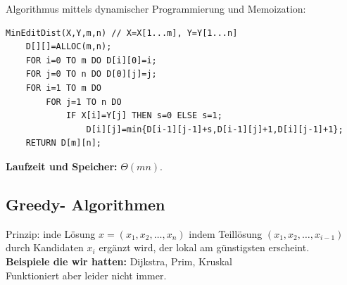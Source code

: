 \documentclass{article}
\begin{document}
                \newpage
                Algorithmus mittels dynamischer Programmierung und Memoization:
                \begin{lstlisting}[style=pseudocode]
MinEditDist(X,Y,m,n) // X=X[1...m], Y=Y[1...n]
    D[][]=ALLOC(m,n);
    FOR i=0 TO m DO D[i][0]=i;
    FOR j=0 TO n DO D[0][j]=j;
    FOR i=1 TO m DO
        FOR j=1 TO n DO
            IF X[i]=Y[j] THEN s=0 ELSE s=1;
                D[i][j]=min{D[i-1][j-1]+s,D[i-1][j]+1,D[i][j-1]+1};
    RETURN D[m][n];
                \end{lstlisting}
                \textbf{Laufzeit und Speicher:} $\Theta (mn)$.
        \subsection{Greedy- Algorithmen}
            Prinzip: inde Lösung $x=(x_1,x_2,\dots ,x_n)$ indem Teillösung $(x_1,x_2,\dots , x_{i-1})$ durch Kandidaten $x_i$ ergänzt wird, der lokal am günstigsten erscheint.\\
            \textbf{Beispiele die wir hatten:} Dijkstra, Prim, Kruskal\\
            Funktioniert aber leider nicht immer.
\end{document}

